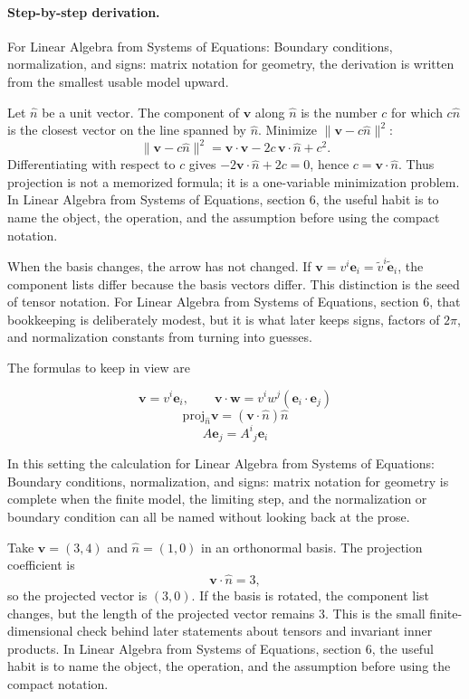 \paragraph{Step-by-step derivation.}

For Linear Algebra from Systems of Equations: Boundary conditions, normalization, and signs: matrix notation for geometry, the derivation is written from the smallest usable model upward.

Let \(\hat n\) be a unit vector.  The component of \(\bm v\) along \(\hat n\) is the number \(c\) for which \(c\hat n\) is the closest vector on the line spanned by \(\hat n\).  Minimize \(\|\bm v-c\hat n\|^2\):
\[
  \|\bm v-c\hat n\|^2=\bm v\cdot\bm v-2c\,\bm v\cdot\hat n+c^2.
\]
Differentiating with respect to \(c\) gives \(-2\bm v\cdot\hat n+2c=0\), hence \(c=\bm v\cdot\hat n\).  Thus projection is not a memorized formula; it is a one-variable minimization problem.  In Linear Algebra from Systems of Equations, section 6, the useful habit is to name the object, the operation, and the assumption before using the compact notation.

When the basis changes, the arrow has not changed.  If \(\bm v=v^i\bm e_i=\tilde v^i\tilde{\bm e}_i\), the component lists differ because the basis vectors differ.  This distinction is the seed of tensor notation.  For Linear Algebra from Systems of Equations, section 6, that bookkeeping is deliberately modest, but it is what later keeps signs, factors of \(2\pi\), and normalization constants from turning into guesses.

The formulas to keep in view are

\[
  \bm v=v^i\bm e_i,\qquad \bm v\cdot\bm w=v^iw^j(\bm e_i\cdot\bm e_j)
\]
\[
  \mathrm{proj}_{\hat n}\bm v=(\bm v\cdot\hat n)\hat n
\]
\[
  A\bm e_j=A^i{}_j\bm e_i
\]

In this setting the calculation for Linear Algebra from Systems of Equations: Boundary conditions, normalization, and signs: matrix notation for geometry is complete when the finite model, the limiting step, and the normalization or boundary condition can all be named without looking back at the prose.




\begin{example}
Take \(\bm v=(3,4)\) and \(\hat n=(1,0)\) in an orthonormal basis.  The projection coefficient is
\[
  \bm v\cdot\hat n=3,
\]
so the projected vector is \((3,0)\).  If the basis is rotated, the component list changes, but the length of the projected vector remains \(3\).  This is the small finite-dimensional check behind later statements about tensors and invariant inner products.  In Linear Algebra from Systems of Equations, section 6, the useful habit is to name the object, the operation, and the assumption before using the compact notation.
\end{example}




